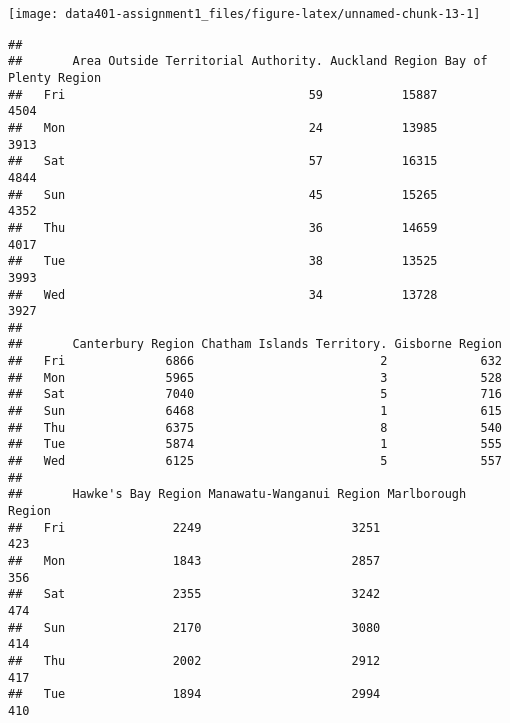 \documentclass[
  10pt,
]{article}
\newenvironment{Shaded}{\begin{snugshade}}{\end{snugshade}}
\newcommand{\CommentTok}[1]{\textcolor[rgb]{0.56,0.35,0.01}{\textit{#1}}}
\newcommand{\FunctionTok}[1]{\textcolor[rgb]{0.00,0.00,0.00}{#1}}
\newcommand{\NormalTok}[1]{#1}
\newcommand{\OtherTok}[1]{\textcolor[rgb]{0.56,0.35,0.01}{#1}}
\newcommand{\SpecialCharTok}[1]{\textcolor[rgb]{0.00,0.00,0.00}{#1}}
\begin{document}
\begin{center}\texttt{[image: data401-assignment1\_files/figure-latex/unnamed-chunk-13-1]} \end{center}

\begin{Shaded}
\end{Shaded}

\begin{verbatim}
##      
##       Area Outside Territorial Authority. Auckland Region Bay of Plenty Region
##   Fri                                  59           15887                 4504
##   Mon                                  24           13985                 3913
##   Sat                                  57           16315                 4844
##   Sun                                  45           15265                 4352
##   Thu                                  36           14659                 4017
##   Tue                                  38           13525                 3993
##   Wed                                  34           13728                 3927
##      
##       Canterbury Region Chatham Islands Territory. Gisborne Region
##   Fri              6866                          2             632
##   Mon              5965                          3             528
##   Sat              7040                          5             716
##   Sun              6468                          1             615
##   Thu              6375                          8             540
##   Tue              5874                          1             555
##   Wed              6125                          5             557
##      
##       Hawke's Bay Region Manawatu-Wanganui Region Marlborough Region
##   Fri               2249                     3251                423
##   Mon               1843                     2857                356
##   Sat               2355                     3242                474
##   Sun               2170                     3080                414
##   Thu               2002                     2912                417
##   Tue               1894                     2994                410

\end{verbatim}
\end{document}
